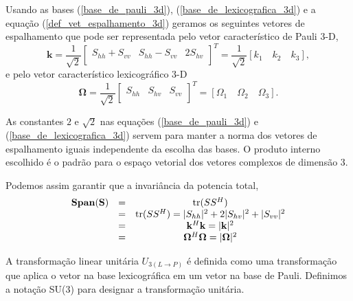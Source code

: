 Usando as bases (\ref{base_de_pauli_3d}), (\ref{base_de_lexicografica_3d}) e a equação (\ref{def_vet_espalhamento_3d}) geramos os seguintes vetores de espalhamento que pode ser representada pelo vetor característico de Pauli $3$-D,
\begin{equation}\label{vetor_pauli_3d}
\mathbf{k}= \frac{1}{\sqrt{2}}\left[
	\begin{array}{ccc}
	S_{hh} + S_{vv} & S_{hh} - S_{vv}& 2S_{hv}   \\
\end{array}\right]^T=\frac{1}{\sqrt{2}}[k_1\quad k_2\quad k_3],
\end{equation}
e pelo vetor característico lexicográfico $3$-D 
\begin{equation}\label{vetor_lexicografico_3d}
\mathbf{\Omega}= \frac{1}{\sqrt{2}}\left[
	\begin{array}{ccc}
	S_{hh}& S_{hv}& S_{vv}   \\
\end{array}\right]^T=[\Omega_1\quad \Omega_2\quad \Omega_3].
\end{equation}

As constantes $2$ e $\sqrt{2}$ nas equações (\ref{base_de_pauli_3d}) e (\ref{base_de_lexicografica_3d}) servem para manter a norma dos vetores de espalhamento iguais independente da escolha das bases. O produto interno escolhido é o padrão para o espaço vetorial dos vetores complexos de dimensão 3.

Podemos assim garantir que a invariância da potencia total,
\begin{equation}\label{span_invariante_3d}
\begin{array}{ccc}
\mathbf{Span(S)} &=& \operatorname{tr}(SS^H)\\
	   &=&  \operatorname{tr}(SS^H)=|S_{hh}|^2+2|S_{hv}|^2+|S_{vv}|^2  \\
	   &=&  \mathbf{k}^H\mathbf{k}=|\mathbf{k}|^2\\
	   &=& \mathbf{\Omega}^H\mathbf{\Omega}=|\mathbf{\Omega}|^2
\end{array}
\end{equation}

A transformação linear unitária $U_{3(L \rightarrow P)}$ é definida como uma transformação que aplica o vetor na base lexicográfica em um vetor na base de Pauli. Definimos a notação \textrm{SU(3)} para designar a transformação  unitária.

